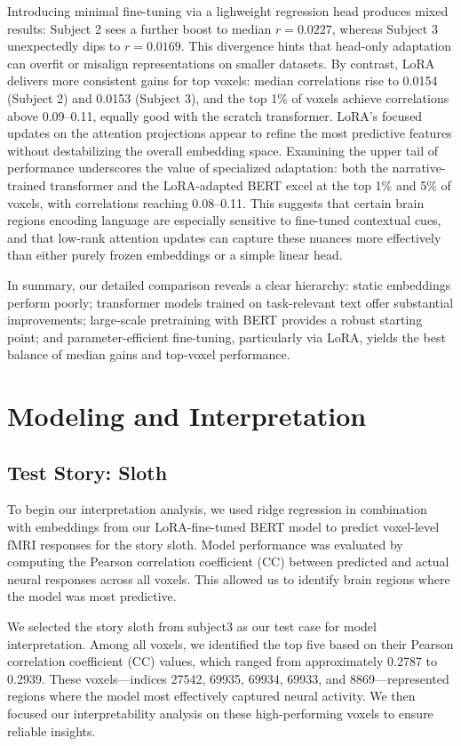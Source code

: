 \documentclass{article}
\begin{document}
Introducing minimal fine-tuning via a lighweight regression head produces mixed results: Subject 2 sees a further boost to median $r=0.0227$, whereas Subject 3 unexpectedly dips to $r=0.0169$. This divergence hints that head-only adaptation can overfit or misalign representations on smaller datasets. By contrast, LoRA delivers more consistent gains for top voxels: median correlations rise to 0.0154 (Subject 2) and 0.0153 (Subject 3), and the top 1\% of voxels achieve correlations above 0.09–0.11, equally good with the scratch transformer. LoRA’s focused updates on the attention projections appear to refine the most predictive features without destabilizing the overall embedding space. Examining the upper tail of performance underscores the value of specialized adaptation: both the narrative-trained transformer and the LoRA-adapted BERT excel at the top 1\% and 5\% of voxels, with correlations reaching 0.08–0.11. This suggests that certain brain regions encoding language are especially sensitive to fine-tuned contextual cues, and that low-rank attention updates can capture these nuances more effectively than either purely frozen embeddings or a simple linear head.

In summary, our detailed comparison reveals a clear hierarchy: static embeddings perform poorly; transformer models trained on task-relevant text offer substantial improvements; large‐scale pretraining with BERT provides a robust starting point; and parameter-efficient fine-tuning, particularly via LoRA, yields the best balance of median gains and top‐voxel performance.

\section{Modeling and Interpretation}

\subsection{Test Story: Sloth}

To begin our interpretation analysis, we used ridge regression in combination with embeddings from our LoRA-fine-tuned BERT model to predict voxel-level fMRI responses for the story sloth. Model performance was evaluated by computing the Pearson correlation coefficient (CC) between predicted and actual neural responses across all voxels. This allowed us to identify brain regions where the model was most predictive.

We selected the story sloth from subject3 as our test case for model interpretation. Among all voxels, we identified the top five based on their Pearson correlation coefficient (CC) values, which ranged from approximately 0.2787 to 0.2939. These voxels—indices 27542, 69935, 69934, 69933, and 8869—represented regions where the model most effectively captured neural activity. We then focused our interpretability analysis on these high-performing voxels to ensure reliable insights.
\end{document}
